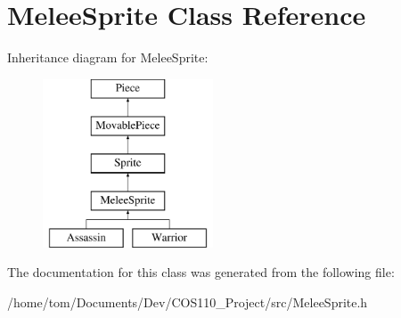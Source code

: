 \hypertarget{classMeleeSprite}{\section{Melee\-Sprite Class Reference}
\label{classMeleeSprite}
}
Inheritance diagram for Melee\-Sprite\-:\begin{figure}[H]
\begin{center}
\leavevmode
\includegraphics[height=5.000000cm]{classMeleeSprite}
\end{center}
\end{figure}


The documentation for this class was generated from the following file\-:\begin{DoxyCompactItemize}
\item 
/home/tom/\-Documents/\-Dev/\-C\-O\-S110\-\_\-\-Project/src/Melee\-Sprite.\-h\end{DoxyCompactItemize}
